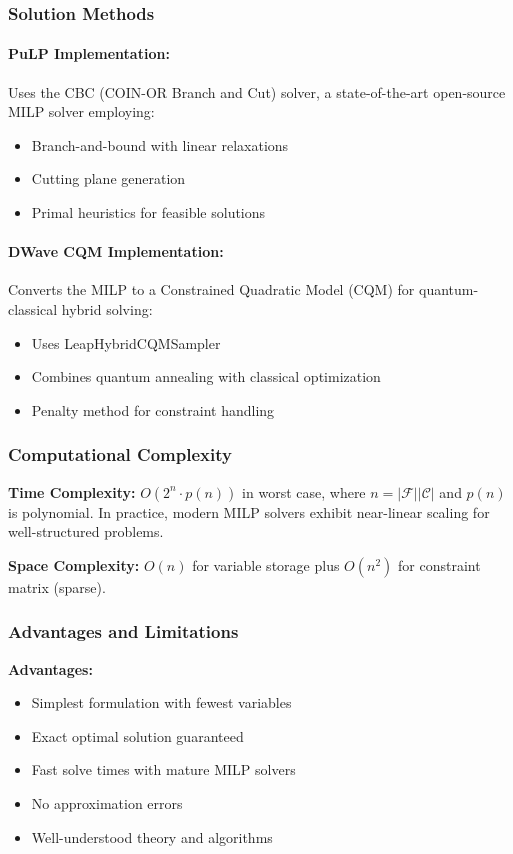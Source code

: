 \documentclass[11pt,a4paper]{article}
\begin{document}
\subsubsection{Solution Methods}

\paragraph{PuLP Implementation:}
Uses the CBC (COIN-OR Branch and Cut) solver, a state-of-the-art open-source MILP solver employing:
\begin{itemize}
    \item Branch-and-bound with linear relaxations
    \item Cutting plane generation
    \item Primal heuristics for feasible solutions
\end{itemize}

\paragraph{DWave CQM Implementation:}
Converts the MILP to a Constrained Quadratic Model (CQM) for quantum-classical hybrid solving:
\begin{itemize}
    \item Uses LeapHybridCQMSampler
    \item Combines quantum annealing with classical optimization
    \item Penalty method for constraint handling
\end{itemize}

\subsubsection{Computational Complexity}

\textbf{Time Complexity:} $O(2^n \cdot p(n))$ in worst case, where $n = |\mathcal{F}||\mathcal{C}|$ and $p(n)$ is polynomial. In practice, modern MILP solvers exhibit near-linear scaling for well-structured problems.

\textbf{Space Complexity:} $O(n)$ for variable storage plus $O(n^2)$ for constraint matrix (sparse).

\subsubsection{Advantages and Limitations}

\textbf{Advantages:}
\begin{itemize}
    \item Simplest formulation with fewest variables
    \item Exact optimal solution guaranteed
    \item Fast solve times with mature MILP solvers
    \item No approximation errors
    \item Well-understood theory and algorithms
\end{itemize}
\end{document}
